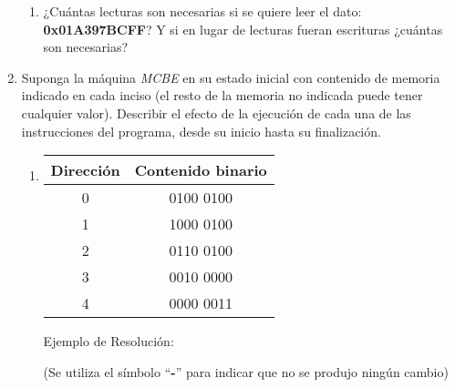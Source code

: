 \documentclass[12pt]{article}
\begin{document}
\begin{enumerate}
\begin{enumerate}
            \item ¿Cuántas lecturas son necesarias si se quiere leer el dato:
                \textbf{0x01A397BCFF}? Y si en lugar de lecturas fueran
                escrituras ¿cuántas son necesarias?

        \end{enumerate}

    \item Suponga la máquina \emph{MCBE} en su estado inicial con contenido de
        memoria indicado en cada inciso (el resto de la memoria no indicada
        puede tener cualquier valor).  Describir el efecto de la ejecución de
        cada una de las instrucciones del programa, desde su inicio hasta su
        finalización.

        \begin{enumerate}

            \item \begin{tabular}{| c | c |}
                    \hline
                    \textbf{Dirección}&\textbf{Contenido binario}\\
                    \hline \hline
                    0 & 0100 0100\\
                    \hline
                    1 & 1000 0100\\
                    \hline
                    2 & 0110 0100\\
                    \hline
                    3 & 0010 0000\\
                    \hline
                    4 & 0000 0011\\
                    \hline
            \end{tabular}

            Ejemplo de Resolución:

            {\tiny(Se utiliza el símbolo ``\textbf{-}'' para indicar que no se
                produjo ningún cambio)}


\end{enumerate}
\end{enumerate}
\end{document}
